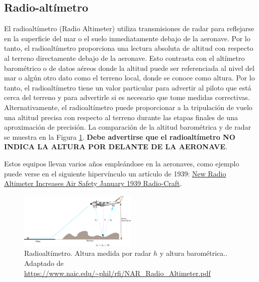 \subsection{Radio-alt\'imetro}
\label{sec:U06.05.radio.altimetro}

El radioalt\'imetro (Radio Altimeter) utiliza transmisiones de radar para reflejarse en la superficie del mar o el suelo inmediatamente debajo de la aeronave. Por lo tanto, el radioalt\'imetro proporciona una lectura absoluta de altitud con respecto al terreno directamente debajo de la aeronave. Esto contrasta con el altímetro barométrico o de datos aéreos donde la altitud puede ser referenciada al nivel del mar o algún otro dato como el terreno local, donde se conoce como altura. Por lo tanto, el radioalt\'imetro tiene un valor particular para advertir al piloto que está cerca del terreno y para advertirle si es necesario que tome medidas correctivas. Alternativamente, el radioalt\'imetro puede proporcionar a la tripulación de vuelo una altitud precisa con respecto al terreno durante las etapas finales de una aproximación de precisión. La comparación de la altitud barométrica y de radar se muestra en la Figura \ref{fig:radioaltimetro.funcionamiento}. \textbf{Debe advertirse que el radioalt\'imetro NO INDICA LA ALTURA POR DELANTE DE LA AERONAVE}.

Estos equipos llevan varios a\~nos emple\'andose en la aeronaves, como ejemplo puede verse en el siguiente hiperv\'inculo un art\'iculo de 1939: 
\href{https://www.rfcafe.com/references/radio-craft/radio-altimeter-increases-air-safety-january-1939-radio-craft.htm}{New Radio Altimeter Increases Air Safety
January 1939 Radio-Craft}. 

\begin{figure}[!h]
  \centering
    \includegraphics[width=0.5\textwidth]{06.radionavegacion/Imagenes/06.05.radar/06_radar_0000.png}
  \caption{Radioalt\'imetro. Altura medida por radar $h$ y altura barom\'etrica.. \\{\tiny Adaptado de \,\url{https://www.naic.edu/~phil/rfi/NAR_Radio_Altimeter.pdf}}}
  \label{fig:radioaltimetro.funcionamiento}
\end{figure}


